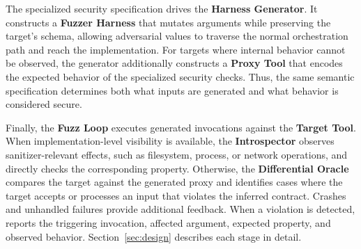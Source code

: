 The specialized security specification drives the \textbf{Harness Generator}.
It constructs a \textbf{Fuzzer Harness} that mutates arguments while
preserving the target's schema, allowing adversarial values to traverse the
normal orchestration path and reach the implementation. For targets where
internal behavior cannot be observed, the generator additionally constructs a
\textbf{Proxy Tool} that encodes the expected behavior of the specialized
security checks. Thus, the same semantic specification determines both what
inputs are generated and what behavior is considered secure.

Finally, the \textbf{Fuzz Loop} executes generated invocations against the \textbf{Target Tool}. When implementation-level visibility is available, the \textbf{Introspector} observes sanitizer-relevant effects, such as filesystem, process, or network operations, and directly checks the corresponding property. Otherwise, the \textbf{Differential Oracle} compares the target against the generated proxy and identifies cases where the target accepts or processes an input that violates the inferred contract. Crashes and unhandled failures provide additional feedback. When a violation is detected, \project{} reports the triggering invocation, affected argument, expected property, and observed behavior. Section~\ref{sec:design} describes each stage in detail.
